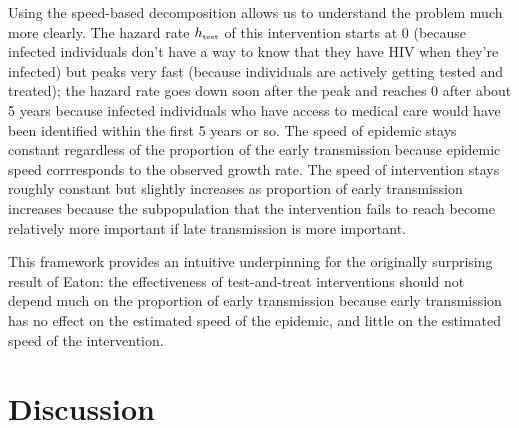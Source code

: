 \documentclass[12pt]{article}\usepackage[]{graphicx}\usepackage[]{color}
\newcommand{\tsub}[2]{#1_{{\textrm{\tiny #2}}}}
\begin{document}
Using the speed-based decomposition allows us to understand the problem much more clearly.
The hazard rate $\tsub{h}{test}$ of this intervention starts at 0 (because infected individuals don't have a way to know that they have HIV when they're infected) but peaks very fast (because individuals are actively getting tested and treated); 
the hazard rate goes down soon after the peak and reaches 0 after about 5 years because infected individuals who have access to medical care would have been identified within the first 5 years or so.
The speed of epidemic stays constant regardless of the proportion of the early transmission because epidemic speed corrresponds to the observed growth rate.
The speed of intervention stays roughly constant but slightly increases as proportion of early transmission increases because the subpopulation that the intervention fails to reach become relatively more important if late transmission is more important.

This framework provides an intuitive underpinning for the originally surprising result of Eaton: the effectiveness of test-and-treat interventions should not depend much on the proportion of early transmission because early transmission has no effect on the estimated speed of the epidemic, and little on the estimated speed of the intervention.

\section{Discussion}


\end{document}
